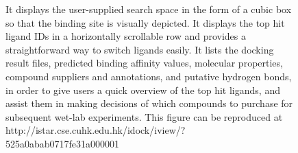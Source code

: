 \documentclass[twocolumn]{bmcart}%
\begin{document}
\begin{backmatter}
  \begin{figure}[h!]
  \caption{
      It displays the user-supplied search space in the form of a cubic box so that the binding site is visually depicted. It displays the top hit ligand IDs in a horizontally scrollable row and provides a straightforward way to switch ligands easily. It lists the docking result files, predicted binding affinity values, molecular properties, compound suppliers and annotations, and putative hydrogen bonds, in order to give users a quick overview of the top hit ligands, and assist them in making decisions of which compounds to purchase for subsequent wet-lab experiments. This figure can be reproduced at http://istar.cse.cuhk.edu.hk/idock/iview/?525a0abab0717fe31a000001
}\label{fig:idock}
      \end{figure}



\end{backmatter}
\end{document}
